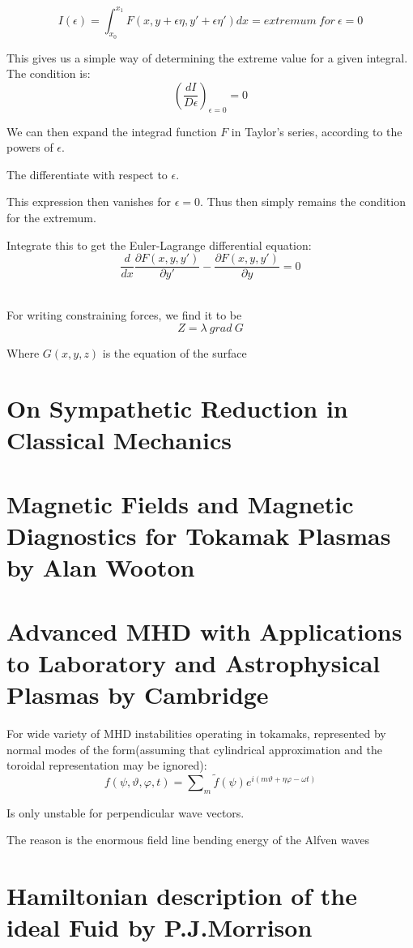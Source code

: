 $$I(\epsilon)=\int^{x_1}_{x_0}F(x,y+\epsilon \eta, y'+\epsilon\eta')dx=extremum \ for \ \epsilon=0$$
\par This gives us a simple way of determining the extreme value for a given integral. The condition is:
$$(\frac{dI}{D\epsilon})_{\epsilon=0}=0$$
\par We can then expand the integrad function $F$ in Taylor's series, according to the powers of $\epsilon$.
\par The differentiate with respect to $\epsilon$.
\par This expression then vanishes for $\epsilon=0$. Thus then simply remains the condition for the extremum.
\par Integrate this to get the Euler-Lagrange differential equation:
$$\frac{d}{dx}\frac{\partial F(x, y, y')}{\partial y'}-\frac{\partial F(x, y, y')}{\partial y}=0$$
\\
\par For writing constraining forces, we find it to be 
$$Z=\lambda \ grad \ G$$
\par Where $G(x,y,z)$ is the equation of the surface
\\

\section{On Sympathetic Reduction in Classical Mechanics}
\section{Magnetic Fields and Magnetic Diagnostics for Tokamak Plasmas by Alan Wooton}
\section{Advanced MHD with Applications to Laboratory and Astrophysical Plasmas by Cambridge }
\par For wide variety of MHD instabilities operating in tokamaks, represented by normal modes of the form(assuming that  cylindrical approximation and the toroidal representation may be ignored):
$$f(\psi,\vartheta, \varphi, t)=\sum\nolimits_m \tilde{f}(\psi) e^{i(m\vartheta + \eta \varphi - \omega t)} $$
\par Is only unstable for perpendicular wave vectors.
\par The reason is the enormous field line bending energy of the Alfven waves

\section{Hamiltonian description of the ideal Fuid by P.J.Morrison}
